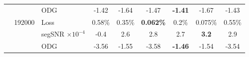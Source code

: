 {\begin{tabular}{@{}l|c|l|c|c|c|c|c|c|@{}}
        \multicolumn{1}{|l|}{} &  & ODG     & -1.42                 & -1.64             & -1.47 & \textbf{-1.41} & -1.67 & -1.43 \\ \cmidrule(l){2-9} 
        \multicolumn{1}{|l|}{} & \multirow{3}{*}{192000} & 
                                    Loss    & 0.58\%                & 0.35\%            & \textbf{0.062\%} & 0.2\% & 0.075\% & 0.55\% \\ \cmidrule(l){3-9} 
        \multicolumn{1}{|l|}{} &  & \makecell{segSNR\\$\times 10^{-4}$}  & -0.4             & 2.6          & 2.8 & 2.7 & \textbf{3.2} & 2.9 \\ \cmidrule(l){3-9} 
        \multicolumn{1}{|l|}{} &  & ODG     & -3.56                 & -1.55             & -3.58 & \textbf{-1.46} & -1.54 & -3.54 \\ \bottomrule
    \end{tabular}%
    }